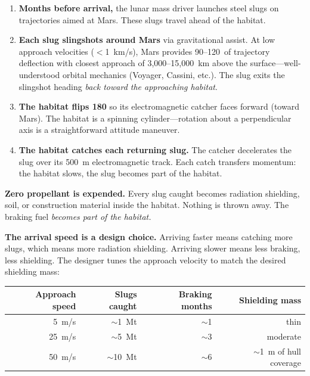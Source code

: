 \documentclass[12pt,letterpaper]{article}
\begin{document}
\begin{enumerate}[label=\arabic*.]
\item \textbf{Months before arrival,} the lunar mass driver launches steel slugs on trajectories aimed at Mars. These slugs travel ahead of the habitat.

\item \textbf{Each slug slingshots around Mars} via gravitational assist. At low approach velocities ($<$1~km/s), Mars provides 90--120\textdegree\ of trajectory deflection with closest approach of 3,000--15,000~km above the surface---well-understood orbital mechanics (Voyager, Cassini, etc.). The slug exits the slingshot heading \emph{back toward the approaching habitat}.

\item \textbf{The habitat flips 180\textdegree} so its electromagnetic catcher faces forward (toward Mars). The habitat is a spinning cylinder---rotation about a perpendicular axis is a straightforward attitude maneuver.

\item \textbf{The habitat catches each returning slug.} The catcher decelerates the slug over its 500~m electromagnetic track. Each catch transfers momentum: the habitat slows, the slug becomes part of the habitat.
\end{enumerate}

\textbf{Zero propellant is expended.} Every slug caught becomes radiation shielding, soil, or construction material inside the habitat. Nothing is thrown away. The braking fuel \emph{becomes part of the habitat.}

\textbf{The arrival speed is a design choice.} Arriving faster means catching more slugs, which means more radiation shielding. Arriving slower means less braking, less shielding. The designer tunes the approach velocity to match the desired shielding mass:

\begin{center}
\small
\begin{tabular}{rrrr}
\toprule
\textbf{Approach speed} & \textbf{Slugs caught} & \textbf{Braking months} & \textbf{Shielding mass} \\
\midrule
5~m/s & $\sim$1~Mt & $\sim$1 & thin \\
25~m/s & $\sim$5~Mt & $\sim$3 & moderate \\
50~m/s & $\sim$10~Mt & $\sim$6 & $\sim$1~m of hull coverage \\
\bottomrule
\end{tabular}
\end{center}
\end{document}

